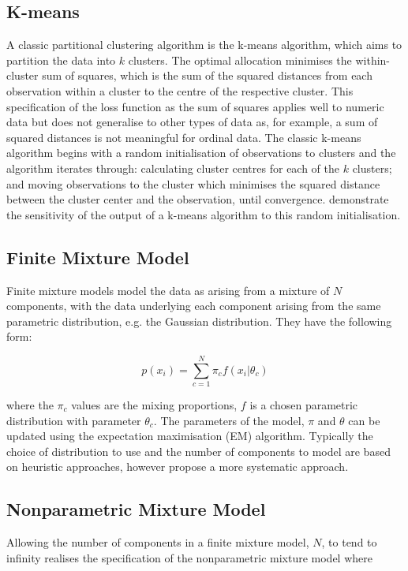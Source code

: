 \documentclass[10pt,a4paper]{article}
\begin{document}
\subsection{K-means}
A classic partitional clustering algorithm is the k-means algorithm, which aims to partition the data into $k$ clusters. The optimal allocation minimises the within-cluster sum of squares, which is the sum of the squared distances from each observation within a cluster to the centre of the respective cluster. This specification of the loss function as the sum of squares applies well to numeric data but does not generalise to other types of data as, for example, a sum of squared distances is not meaningful for ordinal data. The classic k-means algorithm begins with a random initialisation of observations to clusters and the algorithm iterates through: calculating cluster centres for each of the $k$ clusters; and moving observations to the cluster which minimises the squared distance between the cluster center and the observation, until convergence.  demonstrate the sensitivity of the output of a k-means algorithm to this random initialisation.

\subsection{Finite Mixture Model}
Finite mixture models model the data as arising from a mixture of $N$ components, with the data underlying each component arising from the same parametric distribution, e.g. the Gaussian distribution. They have the following form:

\begin{equation}
p(x_i) = \sum_{c = 1}^{N} \pi_{c} f(x_i|\theta_c)
\end{equation}

\noindent where the $\pi_c$ values are the mixing proportions, $f$ is a chosen parametric distribution with parameter $\theta_c$. The parameters of the model, $\pi$ and $\theta$ can be updated using the expectation maximisation (EM) algorithm. Typically the choice of distribution to use and the number of components to model are based on heuristic approaches, however  propose a more systematic approach.

\subsection{Nonparametric Mixture Model}
Allowing the number of components in a finite mixture model, $N$, to tend to infinity realises the specification of the nonparametric mixture model where
\end{document}
